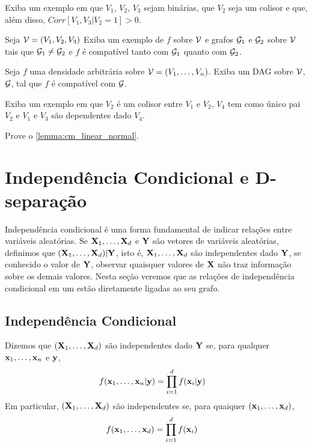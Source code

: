 \begin{exercise}
 Exiba um exemplo em que $V_1$, $V_2$, $V_3$ sejam binárias,
 que $V_2$ seja um colisor e que, além disso,
 $Corr[V_1,V_3|V_2=1] > 0$.
\end{exercise}

\begin{exercise}
 Seja ${\mathcal V} = (V_1, V_2, V_3)$
 Exiba um exemplo de $f$ sobre ${\mathcal V}$ e
 grafos ${\mathcal G}_1$ e ${\mathcal G}_2$ sobre ${\mathcal V}$ tais que
 ${\mathcal G}_1 \neq {\mathcal G}_2$ e
 $f$ é compatível tanto com ${\mathcal G}_1$ 
 quanto com ${\mathcal G}_2$.
\end{exercise}

\begin{exercise}
 Seja $f$ uma densidade arbitrária sobre ${\mathcal V} = (V_1,\ldots,V_n)$.
 Exiba um DAG sobre ${\mathcal V}$, ${\mathcal G}$,
 tal que $f$ é compatível com ${\mathcal G}$.
\end{exercise}

\begin{exercise}
 Exiba um exemplo em que $V_2$ é um colisor 
 entre $V_1$ e $V_2$, 
 $V_4$ tem como único pai $V_2$ e
 $V_1$ e $V_3$ são dependentes dado $V_4$.
\end{exercise}

\begin{exercise}
 Prove o \cref{lemma:cm_linear_normal}.
\end{exercise}

\section{Independência Condicional e D-separação}
\label{sec:d-sep}

Independência condicional é uma forma fundamental de
indicar relações entre variáveis aleatórias.
Se ${\mathbf{X}}_1,\ldots,{\mathbf{X}}_d$ e ${\mathbf{Y}}$ são vetores de variáveis aleatórias,
definimos que $({\mathbf{X}}_1,\ldots,{\mathbf{X}}_d) | {\mathbf{Y}}$, isto é,
${\mathbf{X}}_1,\ldots,{\mathbf{X}}_d$ são independentes dado ${\mathbf{Y}}$, se
conhecido o valor de ${\mathbf{Y}}$, 
observar quaisquer valores de ${\mathbf{X}}$ não traz 
informação sobre os demais valores.
Nesta seção veremos que 
as relações de independência condicional em um \CM
estão diretamente ligadas ao seu grafo.

\subsection{Independência Condicional}
\label{sec:indep}

\begin{definition}
 \label{def:indep}
 Dizemos que $({\mathbf{X}}_1,\ldots,{\mathbf{X}}_d)$ são independentes dado ${\mathbf{Y}}$ se,
 para qualquer ${\mathbf{x}}_1,\ldots,{\mathbf{x}}_n$ e ${\mathbf{y}}$,
 \begin{align*}
  f({\mathbf{x}}_1,\ldots,{\mathbf{x}}_n|{\mathbf{y}})	&= \prod_{i=1}^d f({\mathbf{x}}_i|{\mathbf{y}})
 \end{align*}
 Em particular, $({\mathbf{X}}_1,\ldots,{\mathbf{X}}_d)$ são independentes se,
 para quaiquer $({\mathbf{x}}_1,\ldots,{\mathbf{x}}_d)$,
 \begin{align*}
  f({\mathbf{x}}_1,\ldots,{\mathbf{x}}_d)	&= \prod_{i=1}^d f({\mathbf{x}}_i)
 \end{align*}
\end{definition}

